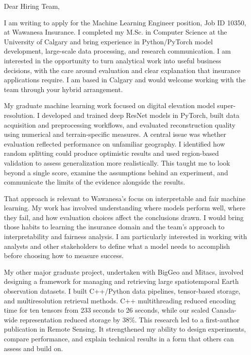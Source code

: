 \documentclass[11pt]{letter}
\begin{document}
\begin{letter}{}
\opening{Dear Hiring Team,}

I am writing to apply for the Machine Learning Engineer position, Job ID 10350, at Wawanesa Insurance. I completed my M.Sc. in Computer Science at the University of Calgary and bring experience in Python/PyTorch model development, large-scale data processing, and research communication. I am interested in the opportunity to turn analytical work into useful business decisions, with the care around evaluation and clear explanation that insurance applications require. I am based in Calgary and would welcome working with the team through your hybrid arrangement.

My graduate machine learning work focused on digital elevation model super-resolution. I developed and trained deep ResNet models in PyTorch, built data acquisition and preprocessing workflows, and evaluated reconstruction quality using numerical and terrain-specific measures. A central issue was whether evaluation reflected performance on unfamiliar geography. I identified how random splitting could produce optimistic results and used region-based validation to assess generalization more realistically. This taught me to look beyond a single score, examine the assumptions behind an experiment, and communicate the limits of the evidence alongside the results.

That approach is relevant to Wawanesa's focus on interpretable and fair machine learning. My work has involved understanding where models perform well, where they fail, and how evaluation choices affect the conclusions drawn. I would bring those habits to learning the insurance domain and the team's approach to interpretability and fairness analysis. I am particularly interested in working with analysts and other stakeholders to define what a model needs to accomplish before choosing how to measure success.

My other major graduate project, undertaken with BigGeo and Mitacs, involved designing a framework for managing and retrieving large spatiotemporal Earth observation datasets. I built C++/Python data pipelines, tensor-based storage, and multiresolution retrieval methods. C++ multithreading reduced encoding time for ten tensors from 233 seconds to 26 seconds, while our scaled Canada-wide representation reduced storage by 38\%. This research led to a first-author publication in Remote Sensing. It strengthened my ability to design experiments, compare performance, and explain technical results in a form that others can assess and build on.


\end{letter}
\end{document}
